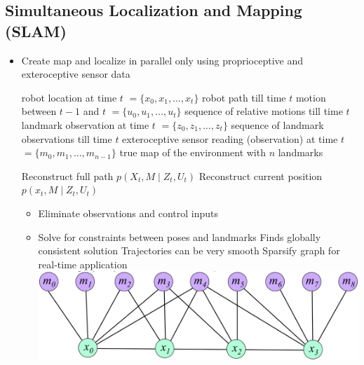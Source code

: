 \subsection{Simultaneous Localization and Mapping (SLAM)}
\begin{itemize}
    \item Create map and localize in parallel only using proprioceptive and exteroceptive sensor data
        \begin{itemize*}
             robot location at time $t$
            $=\{x_0, x_1, \dots, x_t\}$ robot path till time $t$
             motion between $t-1$ and $t$
            $=\{u_0, u_1, \dots, u_t\}$ sequence of relative motions till time $t$
             landmark observation at time $t$
            $=\{z_0, z_1, \dots, z_t\}$ sequence of landmark observations till time $t$
             exteroceptive sensor reading (observation) at time $t$
            $= \{m_0, m_1, \dots, m_{n-1}\}$ true map of the environment with $n$ landmarks
        \end{itemize*}
     Reconstruct full path $p(X_t, M \mid Z_t, U_t)$
     Reconstruct current position $p(x_t, M \mid Z_t, U_t)$
        \begin{itemize}
                \begin{itemize}
                    \item Eliminate observations and control inputs
                    \item Solve for constraints between poses and landmarks
                    \ipro Finds globally consistent solution
                    \ipro Trajectories can be very smooth
                    \icon Sparsify graph for real-time application
                    \\ \includegraphics[width=\linewidth]{./Figures/05_SLAM_FullGraphOptimisation.png}
                \end{itemize}

\end{itemize}
\end{itemize}
